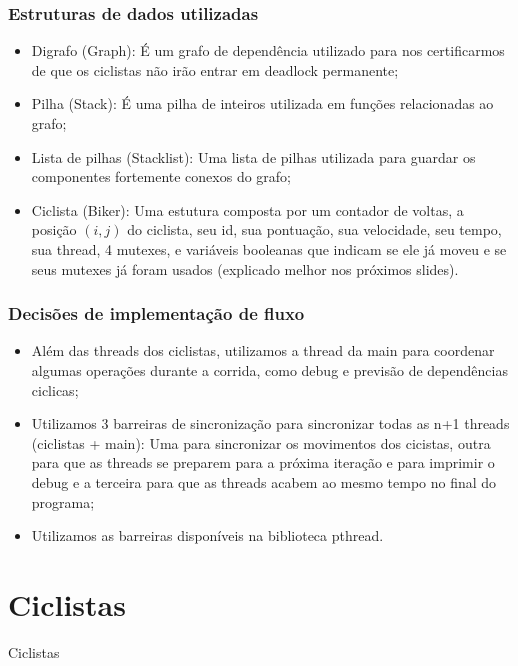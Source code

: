 \documentclass{beamer}
\begin{document}
\begin{frame}
\frametitle{Estruturas de dados utilizadas}
\begin{itemize}
\item Digrafo (Graph): É um grafo de dependência utilizado para nos certificarmos de que os ciclistas não irão entrar em deadlock permanente;
\item Pilha (Stack): É uma pilha de inteiros utilizada em funções relacionadas ao grafo;
\item Lista de pilhas (Stacklist): Uma lista de pilhas utilizada para guardar os componentes fortemente conexos do grafo;
\item Ciclista (Biker): Uma estutura composta por um contador de voltas, a posição $(i, j)$ do ciclista, seu id, sua pontuação, sua velocidade, seu tempo, sua thread, 4 mutexes, e variáveis booleanas que indicam se ele já moveu e se seus mutexes já foram usados (explicado melhor nos próximos slides). 
\end{itemize}
\end{frame}

\begin{frame}
\frametitle{Decisões de implementação de fluxo}
\begin{itemize}
\item Além das threads dos ciclistas, utilizamos a thread da main para coordenar algumas operações durante a corrida, como debug e previsão de dependências ciclicas;
\item Utilizamos 3 barreiras de sincronização para sincronizar todas as n+1 threads (ciclistas + main): Uma para sincronizar os movimentos dos cicistas, outra para que as threads se preparem para a próxima iteração e para imprimir o debug e a terceira para que as threads acabem ao mesmo tempo no final do programa;
\item Utilizamos as barreiras disponíveis na biblioteca pthread. 
\end{itemize}
\end{frame}

\section{Ciclistas}

\begin{frame}
\begin{center}
\huge Ciclistas
\end{center}
\end{frame}
\end{document}
